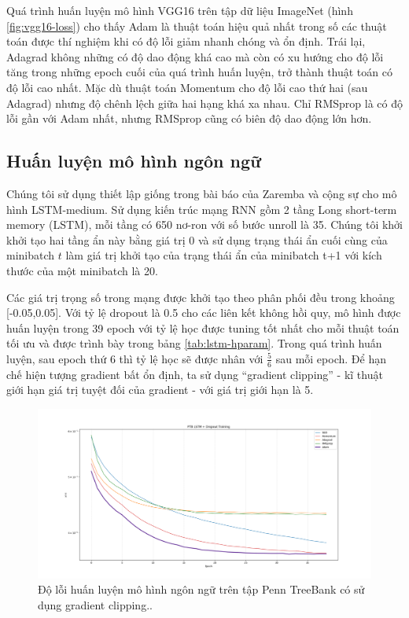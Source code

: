 Quá trình huấn luyện mô hình VGG16 trên tập dữ liệu ImageNet (hình \ref{fig:vgg16-loss}) cho thấy Adam là thuật toán hiệu quả nhất trong số các thuật toán được thí nghiệm khi có độ lỗi giảm nhanh chóng và ổn định. Trái lại, Adagrad không những có độ dao động khá cao mà còn có xu hướng cho độ lỗi tăng trong những epoch cuối của quá trình huấn luyện, trở thành thuật toán có độ lỗi cao nhất. Mặc dù thuật toán Momentum cho độ lỗi cao thứ hai (sau Adagrad) nhưng độ chênh lệch giữa hai hạng khá xa nhau. Chỉ RMSprop là có độ lỗi gần với Adam nhất, nhưng RMSprop cũng có biên độ dao động lớn hơn.

\subsection{Huấn luyện mô hình ngôn ngữ}
\label{exp:lstm}

Chúng tôi sử dụng thiết lập giống trong bài báo của Zaremba và cộng sự \cite{zaremba2014recurrent} cho mô hình LSTM-medium. Sử dụng kiến trúc mạng RNN gồm 2 tầng Long short-term memory (LSTM), mỗi tầng có 650 nơ-ron với số bước unroll là 35. Chúng tôi khởi khởi tạo hai tầng ẩn này bằng giá trị 0 và sử dụng trạng thái ẩn cuối cùng của minibatch $t$ làm giá trị khởi tạo của trạng thái ẩn của minibatch t+1 với kích thước của một minibatch là 20.

Các giá trị trọng số trong mạng được khởi tạo theo phân phối đều trong khoảng [-0.05,0.05]. Với tỷ lệ dropout là 0.5 cho các liên kết không hồi quy, mô hình được huấn luyện trong 39 epoch với tỷ lệ học được tuning tốt nhất cho mỗi thuật toán tối ưu và được trình bày trong bảng \ref{tab:lstm-hparam}. Trong quá trình huấn luyện, sau epoch thứ 6 thì tỷ lệ học sẽ được nhân với $\frac{5}{6}$ sau mỗi epoch. Để hạn chế hiện tượng gradient bất ổn định, ta sử dụng ``gradient clipping'' - kĩ thuật giới hạn giá trị tuyệt đối của gradient - với giá trị giới hạn là 5.

\begin{figure}[htp]
	\centering
	\includegraphics[width=140 mm]{images/ptb.png}
	\caption{Độ lỗi huấn luyện mô hình ngôn ngữ trên tập Penn TreeBank có sử dụng gradient clipping..}
	\label{fig:ptb}
\end{figure}

